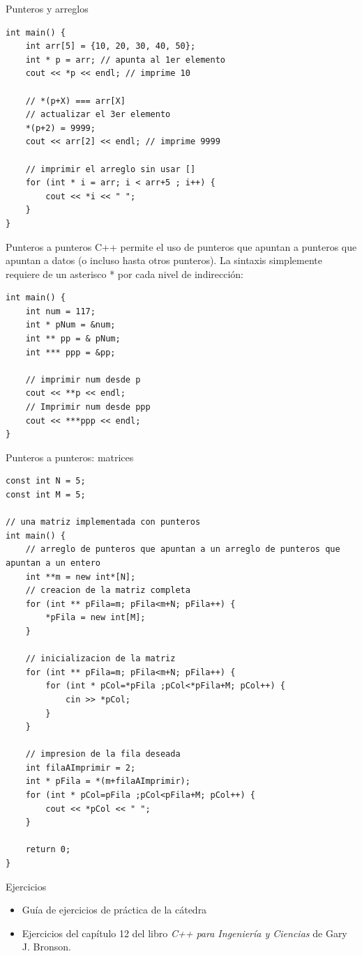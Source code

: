 \documentclass[12pt]{beamer}
\begin{document}
\begin{frame}[fragile]{Punteros y arreglos}
\begin{lstlisting}
int main() {
	int arr[5] = {10, 20, 30, 40, 50};
	int * p = arr; // apunta al 1er elemento
	cout << *p << endl; // imprime 10
	
	// *(p+X) === arr[X]
	// actualizar el 3er elemento
	*(p+2) = 9999;
	cout << arr[2] << endl; // imprime 9999
	
	// imprimir el arreglo sin usar []
	for (int * i = arr; i < arr+5 ; i++) {
		cout << *i << " ";
	}
}        
\end{lstlisting}
\end{frame}

\begin{frame}[fragile]{Punteros a punteros}
    C++ permite el uso de punteros que apuntan a punteros que apuntan a datos (o incluso hasta otros punteros). 
    La sintaxis simplemente requiere de un asterisco \alert{*} por cada nivel de indirección:
\begin{lstlisting}
int main() {
    int num = 117;
    int * pNum = &num;
    int ** pp = & pNum;
    int *** ppp = &pp;

    // imprimir num desde p
    cout << **p << endl;
    // Imprimir num desde ppp
    cout << ***ppp << endl; 
}
\end{lstlisting}
\end{frame}

\begin{frame}[fragile]{Punteros a punteros: matrices}
\begin{lstlisting}[basicstyle=\tiny]
const int N = 5;
const int M = 5;

// una matriz implementada con punteros
int main() {
	// arreglo de punteros que apuntan a un arreglo de punteros que apuntan a un entero
	int **m = new int*[N];
	// creacion de la matriz completa
	for (int ** pFila=m; pFila<m+N; pFila++) { 
		*pFila = new int[M];
	}	
	
	// inicializacion de la matriz
	for (int ** pFila=m; pFila<m+N; pFila++) {
		for (int * pCol=*pFila ;pCol<*pFila+M; pCol++) {
			cin >> *pCol;
		}
	}
	
	// impresion de la fila deseada
	int filaAImprimir = 2;
	int * pFila = *(m+filaAImprimir);
	for (int * pCol=pFila ;pCol<pFila+M; pCol++) {
		cout << *pCol << " ";
	}
	
	return 0;
}
\end{lstlisting}
\end{frame}

\begin{frame}{Ejercicios}
    \begin{itemize}
        \item Guía de ejercicios de práctica de la cátedra
        \item Ejercicios del capítulo 12 del libro \textit{C++ para Ingeniería y Ciencias} de Gary J. Bronson.
    \end{itemize}
\end{frame}
\end{document}
